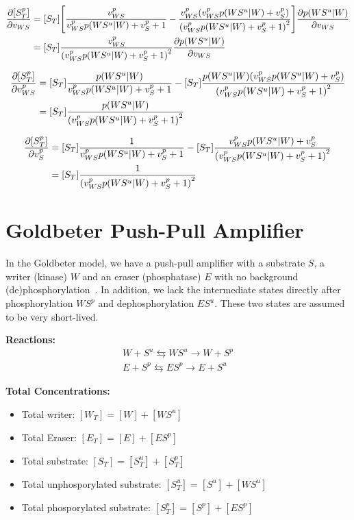 \documentclass[aps,onecolumn,superscriptaddress,notitlepage]{revtex4-1}
\begin{document}
\begin{align}
\pdv{[S^p_T]}{v_{WS}} &=  [S_T]\qty[\frac{v_{WS}^p}{v_{WS}^p p(WS^u|W) + v_S^p+1} -  \frac{v_{WS}^p\qty(v_{WS}^p p(WS^u|W) + v_S^p)}{\qty(v_{WS}^p p(WS^u|W) + v_S^p+1)^2}]\pdv{p(WS^u|W)}{v_{WS}}\\
&= [S_T] \frac{v_{WS}^p}{\qty(v_{WS}^p p(WS^u|W) + v_S^p+1)^2}\pdv{p(WS^u|W)}{v_{WS}}
\end{align}

\begin{align}
\pdv{[S^p_T]}{v_{WS}^p} &=  [S_T]\frac{ p(WS^u|W)}{v_{WS}^p p(WS^u|W) + v_S^p+1} -  [S_T]\frac{p(WS^u|W)\qty(v_{WS}^p p(WS^u|W) + v_S^p)}{\qty(v_{WS}^p p(WS^u|W) + v_S^p+1)^2}\\
&= [S_T]\frac{p(WS^u|W)}{\qty(v_{WS}^p p(WS^u|W) + v_S^p+1)^2}
\end{align}


\begin{align}
\pdv{[S^p_T]}{v_S^p} &=  [S_T]\frac{ 1}{v_{WS}^p p(WS^u|W) + v_S^p+1} - [S_T] \frac{v_{WS}^p p(WS^u|W) + v_S^p}{\qty(v_{WS}^p p(WS^u|W) + v_S^p+1)^2}\\
&= [S_T]\frac{1}{\qty(v_{WS}^p p(WS^u|W) + v_S^p+1)^2}
\end{align}

\section{Goldbeter Push-Pull Amplifier}

In the Goldbeter model, we have a push-pull amplifier with a substrate $S$, a writer (kinase) $W$ and an eraser (phosphatase) $E$ with no background (de)phosphorylation~\cite{Goldbeter1981}. In addition, we lack the intermediate states directly after phosphorylation $WS^p$ and dephosphorylation $ES^u$. These two states are assumed to be very short-lived.

\textbf{Reactions:}
\begin{gather}
W + S^u \leftrightarrows WS^u  \rightarrow W + S^p\\
E + S^p \leftrightarrows ES^p  \rightarrow E + S^u
\end{gather}

\textbf{Total Concentrations:}
\begin{itemize}
\item Total writer: $[W_T] = [W] + [WS^u]$
\item Total Eraser: $[E_T] = [E] + [ES^p]$
\item Total substrate: $[S_T] = [S^u_T] + [S^p_T]$
\item Total unphosporylated substrate: $[S^u_T] = [S^u] + [WS^u]$
\item Total phosporylated substrate: $[S^p_T] = [S^p] + [ES^p]$
\end{itemize}
\end{document}
